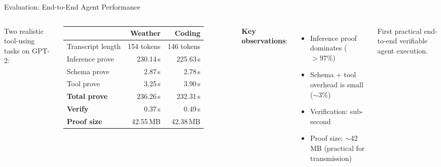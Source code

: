 \documentclass[aspectratio=169,10pt]{beamer}
\newcommand{\pos}[1]{\textcolor{positive}{#1}}
\newcommand{\HL}[1]{\textcolor{emphasis}{#1}}
\begin{document}
\begin{frame}{Evaluation: End-to-End Agent Performance}
\begin{columns}[T]
Two realistic tool-using tasks on GPT-2:

\vspace{4pt}
\begin{tabular}{@{}lrr@{}}
\toprule
& \textbf{Weather} & \textbf{Coding} \\
\midrule
Transcript length & 154 tokens & 146 tokens \\
\midrule
Inference prove & 230.14\,s & 225.63\,s \\
Schema prove & 2.87\,s & 2.78\,s \\
Tool prove & 3.25\,s & 3.90\,s \\
\midrule
\textbf{Total prove} & \pos{236.26\,s} & \pos{232.31\,s} \\
\textbf{Verify} & \pos{0.37\,s} & \pos{0.49\,s} \\
\textbf{Proof size} & 42.55\,MB & 42.38\,MB \\
\bottomrule
\end{tabular}

\textbf{Key observations}:
\begin{itemize}
  \item Inference proof dominates ($>97\%$)
  \item Schema + tool overhead is small ($\sim$3\%)
  \item Verification: sub-second
  \item Proof size: $\sim$42\,MB (practical for transmission)
\end{itemize}

\vspace{4pt}
\HL{First practical end-to-end verifiable agent execution.}
\end{columns}
\end{frame}
\end{document}
